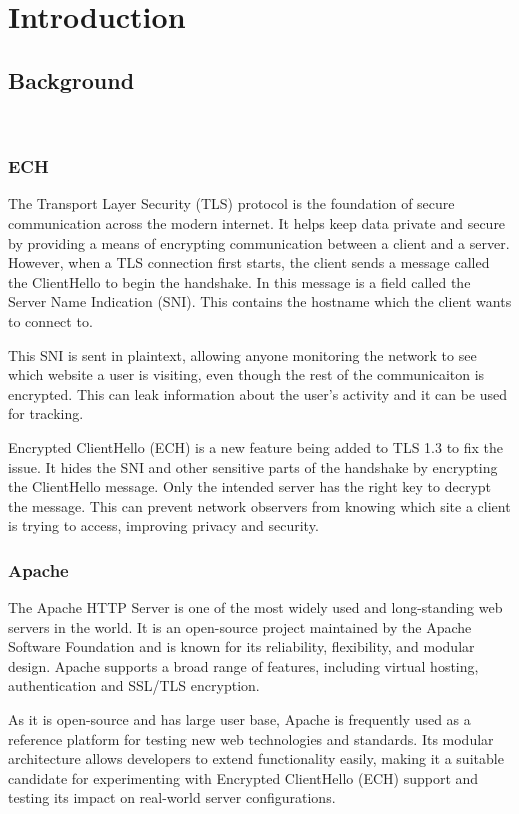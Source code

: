 \documentclass[12pt]{caltech_thesis}
\begin{document}
\tableofcontents
\listoffigures
\listoftables
\printnomenclature

\mainmatter

\chapter{Introduction}


\section{Background}
\
\subsection{ECH}
{The Transport Layer Security (TLS) protocol is the foundation of secure communication across the modern internet. It helps keep data private and secure by providing a means of encrypting communication between a client and a server. However, when a TLS connection first starts, the client sends a message called the ClientHello to begin the handshake. In this message is a field called the Server Name Indication (SNI). This contains the hostname which the client wants to connect to.

This SNI is sent in plaintext, allowing anyone monitoring the network to see which website a user is visiting, even though the rest of the communicaiton is encrypted. This can leak information about the user's activity and it can be used for tracking.

Encrypted ClientHello (ECH) is a new feature being added to TLS 1.3 to fix the issue. It hides the SNI and other sensitive parts of the handshake by encrypting the ClientHello message. Only the intended server has the right key to decrypt the message. This can prevent network observers from knowing which site a client is trying to access, improving privacy and security.
}
\subsection{Apache}
The Apache HTTP Server is one of the most widely used and long-standing web servers in the world. It is an open-source project maintained by the Apache Software Foundation and is known for its reliability, flexibility, and modular design. Apache supports a broad range of features, including virtual hosting, authentication and SSL/TLS encryption.

As it is open-source and has large user base, Apache is frequently used as a reference platform for testing new web technologies and standards. Its modular architecture allows developers to extend functionality easily, making it a suitable candidate for experimenting with Encrypted ClientHello (ECH) support and testing its impact on real-world server configurations.
\end{document}

